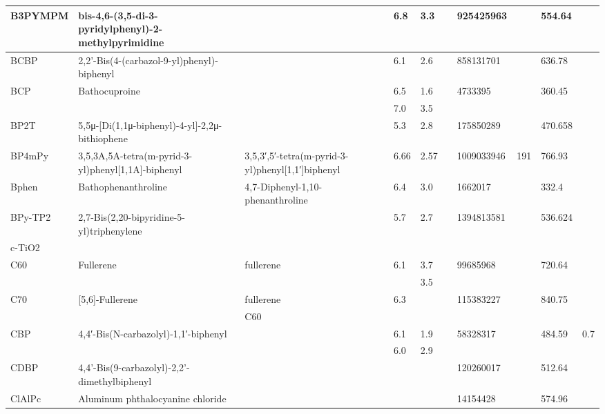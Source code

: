 \documentclass{article}
\begin{document}
\begin{landscape}
\begin{longtable}{| p{} | p{} | p{} | p{} | p{} | p{} | p{} | p{} | p{} | p{} | }
 \hline 
B3PYMPM & bis-4,6-(3,5-di-3-pyridylphenyl)-2-methylpyrimidine &  & 6.8 & 3.3 &  & 925425963 &  & 554.64 &  \\ 
 
 \hline 
BCBP & 2,2'-Bis(4-(carbazol-9-yl)phenyl)-biphenyl &  & 6.1 & 2.6 &  & 858131701 &  & 636.78 &  \\ 
 
 \hline 
BCP & Bathocuproine &  & 6.5 & 1.6 &  & 4733395 &  & 360.45 &  \\ 
 & &  & 7.0 & 3.5 &  &  & & & \\ 
 
 \hline 
BP2T & 5,5μ-[Di(1,1μ-biphenyl)-4-yl]-2,2μ-bithiophene &  & 5.3 & 2.8 &  & 175850289 &  & 470.658 &  \\ 
 
 \hline 
BP4mPy & 3,5,3A,5A-tetra(m-pyrid-3-yl)phenyl[1,1A]-biphenyl & 3,5,3′,5′-tetra(m-pyrid-3-yl)phenyl[1,1′]biphenyl & 6.66 & 2.57 &  & 1009033946 & 191 & 766.93 &  \\ 
 
 \hline 
Bphen & Bathophenanthroline & 4,7-Diphenyl-1,10-phenanthroline & 6.4 & 3.0 &  & 1662017 &  & 332.4 &  \\ 
 
 \hline 
BPy-TP2 &  2,7-Bis(2,20-bipyridine-5-yl)triphenylene &  & 5.7 & 2.7 &  & 1394813581 &  & 536.624 &  \\ 
 
 \hline 
c-TiO2 &  &  &  &  &  &  &  &  &  \\ 
 
 \hline 
C60 & Fullerene & fullerene & 6.1 & 3.7 &  & 99685968 &  & 720.64 &  \\ 
 & &  &  & 3.5 &  &  & & & \\ 
 
 \hline 
C70 & [5,6]-Fullerene & fullerene & 6.3 &  &  & 115383227 &  & 840.75 &  \\ 
 & & C60 &  &  &  &  & & & \\ 
 
 \hline 
CBP & 4,4′-Bis(N-carbazolyl)-1,1′-biphenyl &  & 6.1 & 1.9 &  & 58328317 &  & 484.59 & 0.7 \\ 
 & &  & 6.0 & 2.9 &  &  & & & \\ 
 
 \hline 
CDBP & 4,4'-Bis(9-carbazolyl)-2,2'-dimethylbiphenyl &  &  &  &  & 120260017 &  & 512.64 &  \\ 
 
 \hline 
ClAlPc & Aluminum phthalocyanine chloride &  &  &  &  & 14154428 &  & 574.96 &  \\ 
 

\end{longtable}
\end{landscape}
\end{document}
